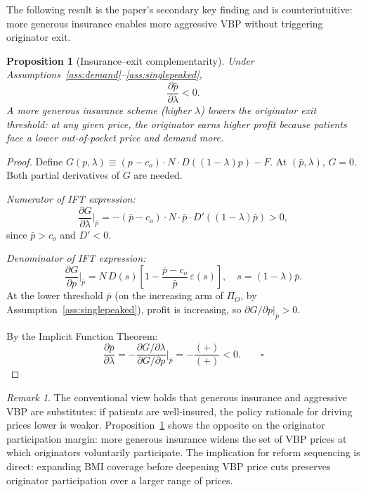 \documentclass[12pt]{article}
\theoremstyle{plain}
\newtheorem{proposition}{Proposition}
\theoremstyle{definition}
\theoremstyle{remark}
\newtheorem{remark}{Remark}
\newcommand{\pbar}{\bar{p}}
\newcommand{\1}{\mathbf{1}}
\begin{document}
The following result is the paper's secondary key finding and is counterintuitive: more generous insurance enables more aggressive VBP without triggering originator exit.

\begin{proposition}[Insurance--exit complementarity]
\label{prop:complement}
Under Assumptions~\ref{ass:demand}--\ref{ass:singlepeaked},
\begin{equation}
\frac{\partial\pbar}{\partial\lambda} < 0.
\label{eq:complement}
\end{equation}
A more generous insurance scheme (higher $\lambda$) lowers the originator exit threshold: at any given price, the originator earns higher profit because patients face a lower out-of-pocket price and demand more.
\end{proposition}

\begin{proof}
Define $G(p,\lambda) \equiv (p-c_o)\cdot N \cdot D((1-\lambda)p) - F$. At $(\pbar, \lambda)$, $G = 0$. Both partial derivatives of $G$ are needed.

\emph{Numerator of IFT expression:}
$$\frac{\partial G}{\partial\lambda}\bigg|_{\pbar} = -(\pbar - c_o)\cdot N \cdot \pbar \cdot D'((1-\lambda)\pbar) > 0,$$
since $\pbar > c_o$ and $D' < 0$.

\emph{Denominator of IFT expression:}
$$\frac{\partial G}{\partial p}\bigg|_{\pbar} = N\,D(s)\!\left[1 - \frac{\pbar - c_o}{\pbar}\,\varepsilon(s)\right], \quad s = (1-\lambda)\pbar.$$
At the lower threshold $\pbar$ (on the increasing arm of $\Pi_O$, by Assumption~\ref{ass:singlepeaked}), profit is increasing, so $\partial G/\partial p|_{\pbar} > 0$.

By the Implicit Function Theorem:
$$\frac{\partial\pbar}{\partial\lambda} = -\frac{\partial G/\partial\lambda}{\partial G/\partial p}\bigg|_{\pbar} = -\frac{(+)}{(+)} < 0. \qquad \square$$
\end{proof}

\begin{remark}
The conventional view holds that generous insurance and aggressive VBP are substitutes: if patients are well-insured, the policy rationale for driving prices lower is weaker. Proposition~\ref{prop:complement} shows the opposite on the originator participation margin: more generous insurance widens the set of VBP prices at which originators voluntarily participate. The implication for reform sequencing is direct: expanding BMI coverage before deepening VBP price cuts preserves originator participation over a larger range of prices.
\end{remark}
\end{document}
